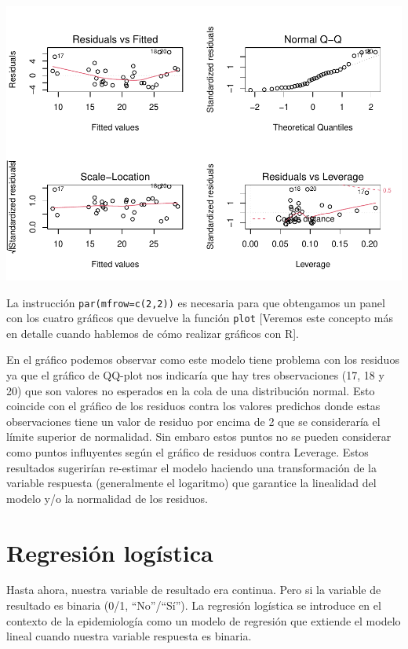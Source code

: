 \documentclass[
]{book}
\begin{document}
\includegraphics{fig/unnamed-chunk-64-1.pdf}

La instrucción \texttt{par(mfrow=c(2,2))} es necesaria para que obtengamos un panel con los cuatro gráficos que devuelve la función \texttt{plot} {[}Veremos este concepto más en detalle cuando hablemos de cómo realizar gráficos con R{]}.

En el gráfico podemos observar como este modelo tiene problema con los residuos ya que el gráfico de QQ-plot nos indicaría que hay tres observaciones (17, 18 y 20) que son valores no esperados en la cola de una distribución normal. Esto coincide con el gráfico de los residuos contra los valores predichos donde estas observaciones tiene un valor de residuo por encima de 2 que se consideraría el límite superior de normalidad. Sin embaro estos puntos no se pueden considerar como puntos influyentes según el gráfico de residuos contra Leverage. Estos resultados sugerirían re-estimar el modelo haciendo una transformación de la variable respuesta (generalmente el logaritmo) que garantice la linealidad del modelo y/o la normalidad de los residuos.

\hypertarget{regresiuxf3n-loguxedstica}{%
\section{Regresión logística}\label{regresiuxf3n-loguxedstica}}

Hasta ahora, nuestra variable de resultado era continua. Pero si la variable de resultado es binaria (0/1, ``No''/``Sí''). La regresión logística se introduce en el contexto de la epidemiología como un modelo de regresión que extiende el modelo lineal cuando nuestra variable respuesta es binaria.
\end{document}
